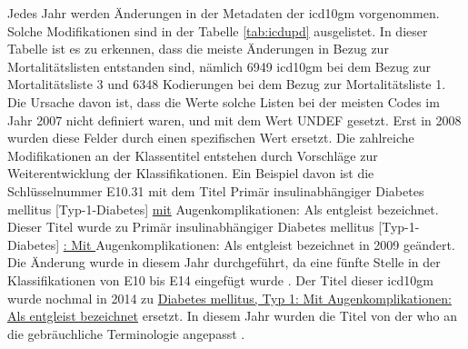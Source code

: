 Jedes Jahr werden Änderungen in der Metadaten der \ac{icd10gm} vorgenommen. Solche Modifikationen sind in der Tabelle \ref{tab:icdupd} ausgelistet. In dieser Tabelle ist es zu erkennen, dass die meiste Änderungen in Bezug zur Mortalitätslisten entstanden sind, nämlich \textsf{6949} \ac{icd10gm} bei dem Bezug zur Mortalitätsliste 3 und \textsf{6348} Kodierungen bei dem Bezug zur Mortalitätsliste 1. Die Ursache davon ist, dass die Werte solche Listen bei der meisten Codes im Jahr 2007 nicht definiert waren, und mit dem Wert \textsf{UNDEF} gesetzt. Erst in 2008 wurden diese Felder durch einen spezifischen Wert ersetzt. Die zahlreiche Modifikationen an der Klassentitel entstehen durch Vorschläge zur Weiterentwicklung der Klassifikationen. Ein Beispiel davon ist die Schlüsselnummer \textsf{E10.31} mit dem Titel \textsf{Primär insulinabhängiger Diabetes mellitus [Typ-1-Diabetes] \underline{mit} Augenkomplikationen: Als entgleist bezeichnet}. Dieser Titel wurde zu \textsf{Primär insulinabhängiger Diabetes mellitus [Typ-1-Diabetes] \underline{: Mit } Augenkomplikationen: Als entgleist bezeichnet} in 2009 geändert. Die Änderung wurde in diesem Jahr durchgeführt, da eine fünfte Stelle in der Klassifikationen von \textsf{E10}  bis \textsf{E14} eingefügt wurde \cite{diab09}. Der Titel dieser \ac{icd10gm} wurde nochmal in 2014 zu \textsf{\underline{Diabetes mellitus, Typ 1: Mit Augenkomplikationen: Als entgleist bezeichnet}} ersetzt. In diesem Jahr wurden die Titel von der \ac{who} an die gebräuchliche Terminologie angepasst \cite{komm14}.

